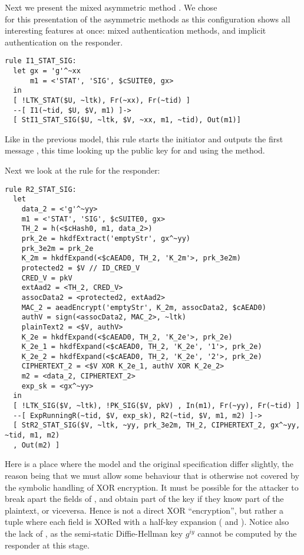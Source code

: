 
\spacehack
\subsubsection{\mStatSig{}}
Next we present the mixed asymmetric method \mStatSig. We chose\\ \mStatSig{} for
this presentation of the asymmetric methods as this configuration shows all
interesting features at once: mixed authentication methods, and implicit
authentication on the responder.

\begin{lstlisting}
rule I1_STAT_SIG:
  let gx = 'g'^~xx
      m1 = <'STAT', 'SIG', $cSUITE0, gx> 
  in
  [ !LTK_STAT($U, ~ltk), Fr(~xx), Fr(~tid) ]
  --[ I1(~tid, $U, $V, m1) ]->
  [ StI1_STAT_SIG($U, ~ltk, $V, ~xx, m1, ~tid), Out(m1)]
\end{lstlisting}
Like in the previous model, this rule starts the initiator and outputs the first
message , this time looking up the public key for  and using the
\mStatSig{} method.

Next we look at the rule for the responder:
\begin{lstlisting}
rule R2_STAT_SIG:
  let
    data_2 = <'g'^~yy>
    m1 = <'STAT', 'SIG', $cSUITE0, gx> 
    TH_2 = h(<$cHash0, m1, data_2>)
    prk_2e = hkdfExtract('emptyStr', gx^~yy)
    prk_3e2m = prk_2e
    K_2m = hkdfExpand(<$cAEAD0, TH_2, 'K_2m'>, prk_3e2m)
    protected2 = $V // ID_CRED_V
    CRED_V = pkV
    extAad2 = <TH_2, CRED_V> 
    assocData2 = <protected2, extAad2>
    MAC_2 = aeadEncrypt('emptyStr', K_2m, assocData2, $cAEAD0)
    authV = sign(<assocData2, MAC_2>, ~ltk)
    plainText2 = <$V, authV>
    K_2e = hkdfExpand(<$cAEAD0, TH_2, 'K_2e'>, prk_2e)
    K_2e_1 = hkdfExpand(<$cAEAD0, TH_2, 'K_2e', '1'>, prk_2e)
    K_2e_2 = hkdfExpand(<$cAEAD0, TH_2, 'K_2e', '2'>, prk_2e)
    CIPHERTEXT_2 = <$V XOR K_2e_1, authV XOR K_2e_2> 
    m2 = <data_2, CIPHERTEXT_2>
    exp_sk = <gx^~yy>
  in
  [ !LTK_SIG($V, ~ltk), !PK_SIG($V, pkV) , In(m1), Fr(~yy), Fr(~tid) ]
  --[ ExpRunningR(~tid, $V, exp_sk), R2(~tid, $V, m1, m2) ]->
  [ StR2_STAT_SIG($V, ~ltk, ~yy, prk_3e2m, TH_2, CIPHERTEXT_2, gx^~yy, ~tid, m1, m2) 
  , Out(m2) ]
\end{lstlisting}
Here is a place where the model and the original specification differ
slightly, the reason being that we must allow some behaviour that is
otherwise not covered by the symbolic handling of XOR encryption. It must
be possible for the attacker to break apart the fields of
, and obtain part of the key 
if they know part of the plaintext, or viceversa.
%
Hence  is not a direct XOR ``encryption'', but rather a tuple
where each field is XORed with a half-key expansion ( and
).  Notice also the lack of , as the semi-static
Diffie-Hellman key $g^{iy}$ cannot be computed by the responder at this stage.

